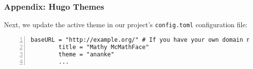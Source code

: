 \begin{frame}[fragile]
    \frametitle{Appendix: Hugo Themes}

    Next, we update the active theme in our project's \texttt{config.toml} configuration file:

    \bigskip

    \begin{lstlisting}[style=saneCode,gobble=8,title={config.toml},numbers=left]
        baseURL = "http://example.org/" # If you have your own domain name, add it here.
        title = "Mathy McMathFace"
        theme = "ananke"
        ...
    \end{lstlisting}

\end{frame}
